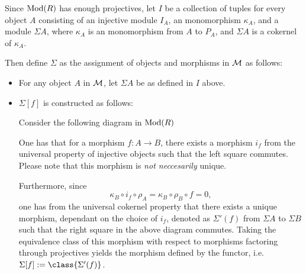 \begin{definition}
    \label{def:stmod_sigma}
    Since \( \operatorname{Mod}(R) \) has enough projectives, let \( I \) be a collection of tuples for every object \( A \) consisting of an injective module \( I_A \), an monomorphism \( \kappa_A \), and a module \( \Sigma A \), where \( \kappa_A \) is an monomorphism from \( A \) to \( P_A \), and \( \Sigma A \) is a cokernel of \( \kappa_A \).

    Then define \( \Sigma \) as the assignment of objects and morphisms in \( {\mathcal{M}} \) as follows:
    \begin{itemize}
        \item {
            For any object \( A \) in \( {\mathcal{M}} \), let \( \Sigma A \) be as defined in \( I \) above.
        }
        \item {
            \( \Sigma [f] \) is constructed as follows:

            Consider the following diagram in \( \operatorname{Mod}(R) \)
            \begin{center}
            \end{center}

            One has that for a morphism \( f: A \to B \), there exists a morphism \( i_f \) from the universal property of injective objects such that the left square commutes. Please note that this morphism is \emph{not neccesarily} unique.

            Furthermore, since
            \[
                \kappa_B \circ i_f \circ \rho_A = \kappa_B \circ \rho_B \circ f = 0,
            \]
            one has from the universal cokernel property that there exists a unique morphism, dependant on the choice of \( i_f \), denoted as \( \Sigma'(f) \) from \( \Sigma A \) to \( \Sigma B \) such that the right square in the above diagram commutes. Taking the equivalence class of this morphism with respect to morphisms factoring through projectives yields the morphism defined by the functor, i.e. \( \Sigma [f] := \class{\Sigma'(f)} \).
        }
    \end{itemize}
\end{definition}

